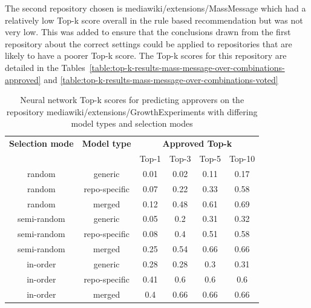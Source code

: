 The second repository chosen is mediawiki/extensions/MassMessage which had a relatively low Top-k score overall in the rule based recommendation but was not very low. This was added to ensure that the conclusions drawn from the first repository about the correct settings could be applied to repositories that are likely to have a poorer Top-k score. The Top-k scores for this repository are detailed in the Tables~\ref{table:top-k-results-mass-message-over-combinations-approved} and \ref{table:top-k-results-mass-message-over-combinations-voted}

\begin{table}[H]
    \centering
    \begin{tabular}{@{}c c c c c c@{}} 
 \hline
    \textbf{Selection mode} & \textbf{Model type} &
    \multicolumn{4}{c}{\textbf{Approved Top-k}} \\
      & & {Top-1} & {Top-3} & {Top-5} & {Top-10} \\
\hline
random & generic & 0.01 & 0.02 & 0.11 & 0.17 \\
random & repo-specific & 0.07 & 0.22 & 0.33 & 0.58 \\
random & merged & 0.12 & 0.48 & 0.61 & 0.69 \\
\hline
semi-random & generic & 0.05 & 0.2 & 0.31 & 0.32 \\
semi-random & repo-specific & 0.08 & 0.4 & 0.51 & 0.58 \\
semi-random & merged & 0.25 & 0.54 & 0.66 & 0.66 \\
\hline
in-order & generic & 0.28 & 0.28 & 0.3 & 0.31 \\
in-order & repo-specific & 0.41 & 0.6 & 0.6 & 0.6 \\
in-order & merged & 0.4 & 0.66 & 0.66 & 0.66 \\
\hline
\end{tabular}
    \caption{Neural network Top-k scores for predicting approvers on the repository mediawiki/extensions/GrowthExperiments with differing model types and selection modes}
    \label{table:top-k-results-growth-experiements-over-combinations-approved}
\end{table}

